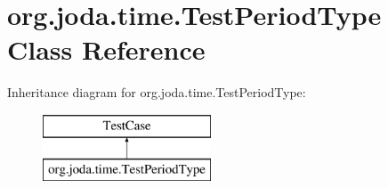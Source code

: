 \hypertarget{classorg_1_1joda_1_1time_1_1_test_period_type}{\section{org.\-joda.\-time.\-Test\-Period\-Type Class Reference}
\label{classorg_1_1joda_1_1time_1_1_test_period_type}
}
Inheritance diagram for org.\-joda.\-time.\-Test\-Period\-Type\-:\begin{figure}[H]
\begin{center}
\leavevmode
\includegraphics[height=2.000000cm]{classorg_1_1joda_1_1time_1_1_test_period_type}
\end{center}
\end{figure}
